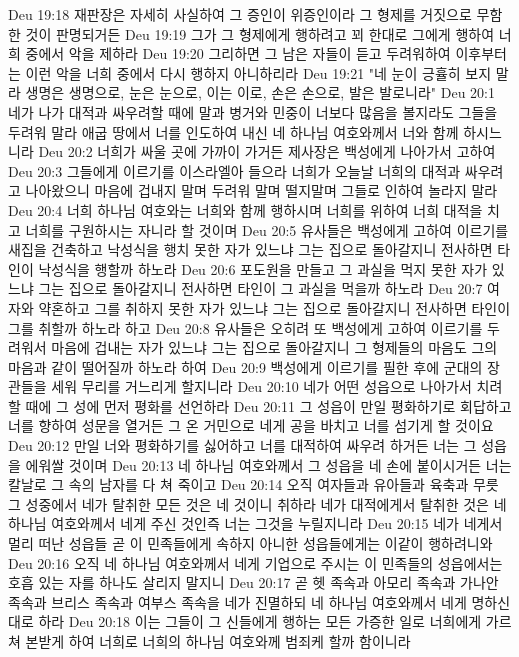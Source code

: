 Deu 19:18  재판장은 자세히 사실하여 그 증인이 위증인이라 그 형제를 거짓으로 무함한 것이 판명되거든
Deu 19:19  그가 그 형제에게 행하려고 꾀 한대로 그에게 행하여 너희 중에서 악을 제하라
Deu 19:20  그리하면 그 남은 자들이 듣고 두려워하여 이후부터는 이런 악을 너희 중에서 다시 행하지 아니하리라
Deu 19:21  "네 눈이 긍휼히 보지 말라 생명은 생명으로, 눈은 눈으로, 이는 이로, 손은 손으로, 발은 발로니라"
Deu 20:1  네가 나가 대적과 싸우려할 때에 말과 병거와 민중이 너보다 많음을 볼지라도 그들을 두려워 말라 애굽 땅에서 너를 인도하여 내신 네 하나님 여호와께서 너와 함께 하시느니라
Deu 20:2  너희가 싸울 곳에 가까이 가거든 제사장은 백성에게 나아가서 고하여
Deu 20:3  그들에게 이르기를 이스라엘아 들으라 너희가 오늘날 너희의 대적과 싸우려고 나아왔으니 마음에 겁내지 말며 두려워 말며 떨지말며 그들로 인하여 놀라지 말라
Deu 20:4  너희 하나님 여호와는 너희와 함께 행하시며 너희를 위하여 너희 대적을 치고 너희를 구원하시는 자니라 할 것이며
Deu 20:5  유사들은 백성에게 고하여 이르기를 새집을 건축하고 낙성식을 행치 못한 자가 있느냐 그는 집으로 돌아갈지니 전사하면 타인이 낙성식을 행할까 하노라
Deu 20:6  포도원을 만들고 그 과실을 먹지 못한 자가 있느냐 그는 집으로 돌아갈지니 전사하면 타인이 그 과실을 먹을까 하노라
Deu 20:7  여자와 약혼하고 그를 취하지 못한 자가 있느냐 그는 집으로 돌아갈지니 전사하면 타인이 그를 취할까 하노라 하고
Deu 20:8  유사들은 오히려 또 백성에게 고하여 이르기를 두려워서 마음에 겁내는 자가 있느냐 그는 집으로 돌아갈지니 그 형제들의 마음도 그의 마음과 같이 떨어질까 하노라 하여
Deu 20:9  백성에게 이르기를 필한 후에 군대의 장관들을 세워 무리를 거느리게 할지니라
Deu 20:10  네가 어떤 성읍으로 나아가서 치려할 때에 그 성에 먼저 평화를 선언하라
Deu 20:11  그 성읍이 만일 평화하기로 회답하고 너를 향하여 성문을 열거든 그 온 거민으로 네게 공을 바치고 너를 섬기게 할 것이요
Deu 20:12  만일 너와 평화하기를 싫어하고 너를 대적하여 싸우려 하거든 너는 그 성읍을 에워쌀 것이며
Deu 20:13  네 하나님 여호와께서 그 성읍을 네 손에 붙이시거든 너는 칼날로 그 속의 남자를 다 쳐 죽이고
Deu 20:14  오직 여자들과 유아들과 육축과 무릇 그 성중에서 네가 탈취한 모든 것은 네 것이니 취하라 네가 대적에게서 탈취한 것은 네 하나님 여호와께서 네게 주신 것인즉 너는 그것을 누릴지니라
Deu 20:15  네가 네게서 멀리 떠난 성읍들 곧 이 민족들에게 속하지 아니한 성읍들에게는 이같이 행하려니와
Deu 20:16  오직 네 하나님 여호와께서 네게 기업으로 주시는 이 민족들의 성읍에서는 호흡 있는 자를 하나도 살리지 말지니
Deu 20:17  곧 헷 족속과 아모리 족속과 가나안 족속과 브리스 족속과 여부스 족속을 네가 진멸하되 네 하나님 여호와께서 네게 명하신 대로 하라
Deu 20:18  이는 그들이 그 신들에게 행하는 모든 가증한 일로 너희에게 가르쳐 본받게 하여 너희로 너희의 하나님 여호와께 범죄케 할까 함이니라
